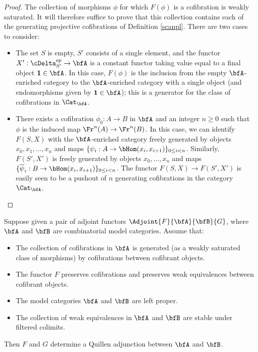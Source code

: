 \begin{proof}
The collection of morphisms $\phi$ for which $F(\phi)$ is a cofibration is weakly saturated.
It will therefore suffice to prove that this collection contains each of the generating projective cofibrations
of Definition \ref{scanpl}. There are two cases to consider:
\begin{itemize}
\item[$(a)$] The set $S$ is empty, $S'$ consists of a single element, and the functor
$X': \cDelta_{S'}^{op} \rightarrow \bfA$ is a constant functor taking value equal to a final object
${\bf 1} \in \bfA$. In this case, $F(\phi)$ is the inclusion from the empty $\bfA$-enriched category
to the $\bfA$-enriched category with a single object (and endomorphisms given by
${\bf 1} \in \bfA$); this is a generator for the class of cofibrations in $\Cat_{\bfA}$.

\item[$(b)$] There exists a cofibration $\phi_0: A \rightarrow B$ in $\bfA$ and an integer $n \geq 0$ such that $\phi$ is the induced map $\Fr^n(A) \rightarrow \Fr^{n}(B)$. In this case, we can identify
$F(S,X)$ with the $\bfA$-enriched category freely generated by objects $x_0, x_1, \ldots, x_n$ and
maps $\{ \psi_i: A \rightarrow \bHom(x_i, x_{i+1}) \}_{0 \leq i < n}$. Similarly, $F(S',X')$ is freely generated by objects $x_0, \ldots, x_n$ and maps $\{ \overline{\psi}_i: B \rightarrow \bHom(x_i, x_{i+1}) \}_{0 \leq i < n}$. The functor $F(S,X) \rightarrow F(S',X')$ is easily seen to be a pushout of $n$ generating cofibrations in the category $\Cat_{\bfA}$.
\end{itemize}
\end{proof}

\begin{lemma}\label{speed}
Suppose given a pair of adjoint functors $\Adjoint{F}{\bfA}{\bfB}{G}$, where $\bfA$ and $\bfB$ are combinatorial model categories. Assume that:
\begin{itemize}
\item[$(1)$] The collection of cofibrations in $\bfA$ is generated (as a weakly saturated class of morphisms) by cofibrations between cofibrant objects.
\item[$(2)$] The functor $F$ preserves cofibrations and preserves weak equivalences between cofibrant objects.
\item[$(3)$] The model categories $\bfA$ and $\bfB$ are left proper.
\item[$(4)$] The collection of weak equivalences in $\bfA$ and $\bfB$ are stable under filtered colimits.
\end{itemize}
Then $F$ and $G$ determine a Quillen adjunction between $\bfA$ and $\bfB$.
\end{lemma}

